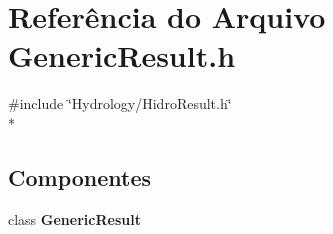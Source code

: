 \section{Referência do Arquivo Generic\+Result.\+h}
\label{_generic_result_8h}
{\ttfamily \#include \char`\"{}Hydrology/\+Hidro\+Result.\+h\char`\"{}}\\*
\subsection*{Componentes}
\begin{DoxyCompactItemize}
\item 
class {\bf Generic\+Result}
\end{DoxyCompactItemize}
